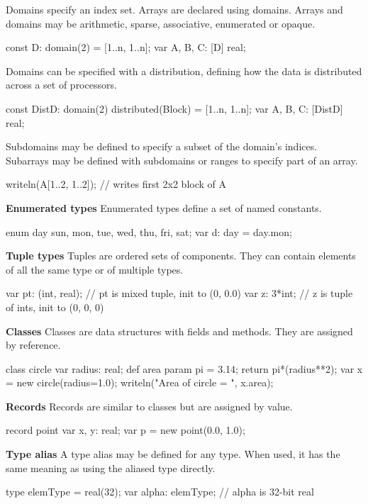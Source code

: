 \documentclass[landscape]{report}
\begin{document}
{Domains specify an index set.  Arrays are declared using domains.
Arrays and domains may
be arithmetic, sparse, associative, enumerated or opaque.  
\begin{chapel}
const D: domain(2) = [1..n, 1..n];
var A, B, C: [D] real;
\end{chapel}
Domains can be specified with a distribution, defining how the
data is distributed across a set of processors.
\begin{chapel}
const DistD: domain(2) distributed(Block) = [1..n, 1..n];
var A, B, C: [DistD] real;
\end{chapel}
Subdomains may be
defined to specify a subset of the domain's indices. Subarrays may be defined
with subdomains or ranges to specify part of an array.
\begin{chapel}
writeln(A[1..2, 1..2]); // writes first 2x2 block of A
\end{chapel}
{\bf Enumerated types} \newline
Enumerated types define a set of named constants.
\begin{chapel}
enum day {sun, mon, tue, wed, thu, fri, sat};
var d: day = day.mon;
\end{chapel} 
{\bf Tuple types} \newline
Tuples are ordered sets of components.  They can contain
elements of all the same type or of multiple types.
\begin{chapel}
var pt: (int, real); // pt is mixed tuple, init to (0, 0.0) 
var z: 3*int; // z is tuple of ints, init to (0, 0, 0)
\end{chapel}
{\bf Classes} \newline
Classes are data structures with fields and methods.  They
are assigned by reference.
\begin{chapel}
class circle {
  var radius: real;
  def area {
    param pi = 3.14;
    return pi*(radius**2);
  }
}
var x = new circle(radius=1.0);
writeln("Area of circle = ", x.area);
\end{chapel}
{\bf Records} \newline
Records are similar to classes but are assigned by
value.
\begin{chapel} 
record point {
  var x, y: real;
}
var p = new point(0.0, 1.0);
\end{chapel}
{\bf Type alias} \newline
A type alias may be defined for any type.  When used, it has the
same meaning as using the aliased type directly. 
\begin{chapel}
type elemType = real(32);
var alpha: elemType; // alpha is 32-bit real
\end{chapel}
}
\end{document}

